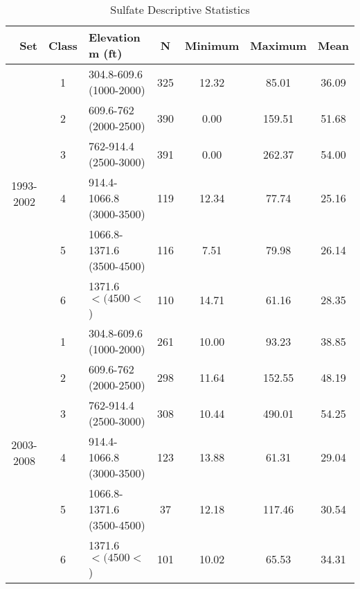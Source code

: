 \begin{table}[htbp]
  \centering
	\caption{Sulfate Descriptive Statistics}
    \begin{tabular}{rrlcccc}
    \toprule
    Set   & Class & Elevation m (ft) & N     & Minimum & Maximum & Mean \\
    \midrule
    \multicolumn{1}{c}{\multirow{6}[2]{*}{\begin{sideways}1993-2002\end{sideways}}} & \multicolumn{1}{c}{1} & \multicolumn{1}{l}{304.8-609.6 (1000-2000)} & 325   & 12.32  & 85.01  & 36.09  \\
    \multicolumn{1}{c}{} & \multicolumn{1}{c}{2} & \multicolumn{1}{l}{609.6-762 (2000-2500)} & 390   & 0.00  & 159.51  & 51.68  \\
    \multicolumn{1}{c}{} & \multicolumn{1}{c}{3} & \multicolumn{1}{l}{762-914.4 (2500-3000)} & 391   & 0.00  & 262.37  & 54.00  \\
    \multicolumn{1}{c}{} & \multicolumn{1}{c}{4} & \multicolumn{1}{l}{914.4-1066.8 (3000-3500)} & 119   & 12.34  & 77.74  & 25.16  \\
    \multicolumn{1}{c}{} & \multicolumn{1}{c}{5} & \multicolumn{1}{l}{1066.8-1371.6 (3500-4500)} & 116   & 7.51  & 79.98  & 26.14  \\
    \multicolumn{1}{c}{} & \multicolumn{1}{c}{6} & \multicolumn{1}{l}{1371.6$< (4500<$)} & 110   & 14.71  & 61.16  & 28.35  \\\midrule
    \multicolumn{1}{c}{\multirow{6}[2]{*}{\begin{sideways}2003-2008\end{sideways}}} & \multicolumn{1}{c}{1} & \multicolumn{1}{l}{304.8-609.6 (1000-2000)} & 261   & 10.00  & 93.23  & 38.85  \\
    \multicolumn{1}{c}{} & \multicolumn{1}{c}{2} & \multicolumn{1}{l}{609.6-762 (2000-2500)} & 298   & 11.64  & 152.55  & 48.19  \\
    \multicolumn{1}{c}{} & \multicolumn{1}{c}{3} & \multicolumn{1}{l}{762-914.4 (2500-3000)} & 308   & 10.44  & 490.01  & 54.25  \\
    \multicolumn{1}{c}{} & \multicolumn{1}{c}{4} & \multicolumn{1}{l}{914.4-1066.8 (3000-3500)} & 123   & 13.88  & 61.31  & 29.04  \\
    \multicolumn{1}{c}{} & \multicolumn{1}{c}{5} & \multicolumn{1}{l}{1066.8-1371.6 (3500-4500)} & 37    & 12.18  & 117.46  & 30.54  \\
    \multicolumn{1}{c}{} & \multicolumn{1}{c}{6} & \multicolumn{1}{l}{1371.6$< (4500<$)} & 101   & 10.02  & 65.53  & 34.31  \\\midrule

\end{tabular}
\end{table}
